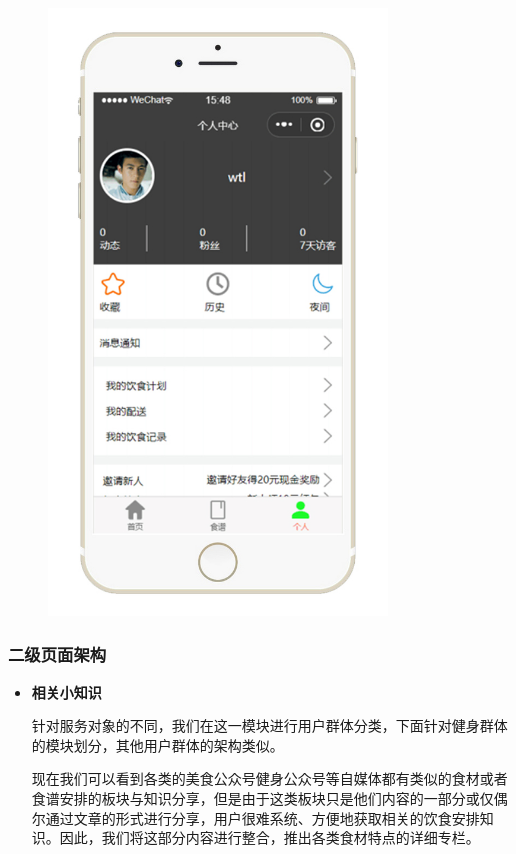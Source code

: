 \documentclass[UTF8,12pt]{ctexart}
\numberwithin{figure}{section}%
\begin{document}
\begin{spacing}{2}
\begin{itemize}
	\begin{figure}[!htb]
		\centering
		\includegraphics[width=9cm]{fig/!16}
	\end{figure}
	
\end{itemize}



\subsubsection{二级页面架构}

\begin{itemize}
	\item \textbf{相关小知识}
	
	\setlength{\parindent}{2em}针对服务对象的不同，我们在这一模块进行用户群体分类，下面针对健身群体的模块划分，其他用户群体的架构类似。
	
	现在我们可以看到各类的美食公众号健身公众号等自媒体都有类似的食材或者食谱安排的板块与知识分享，但是由于这类板块只是他们内容的一部分或仅偶尔通过文章的形式进行分享，用户很难系统、方便地获取相关的饮食安排知识。因此，我们将这部分内容进行整合，推出各类食材特点的详细专栏。
	

\end{itemize}
\end{spacing}
\end{document}
